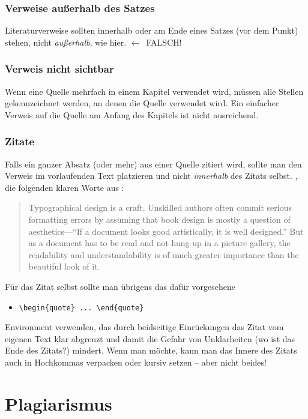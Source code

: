 \subsubsection{Verweise außerhalb des Satzes}
Literaturverweise sollten innerhalb oder am Ende eines Satzes (vor
dem Punkt) stehen, nicht \emph{außerhalb}, wie
hier. \cite[siehe][]{Oetiker01} $\leftarrow$~FALSCH!

\subsubsection{Verweis nicht sichtbar}
Wenn eine Quelle\cite{Kopka98} mehrfach in einem Kapitel verwendet wird, müssen alle Stellen gekennzeichnet werden, an denen die Quelle\cite{Kopka98} verwendet wird. Ein einfacher Verweis auf die Quelle\cite{Kopka98} am Anfang des Kapitels ist nicht ausreichend.

\subsubsection{Zitate}
Falls ein ganzer Absatz (oder mehr) aus einer Quelle zitiert wird,
sollte man den Verweis im vorlaufenden Text platzieren und nicht
\emph{innerhalb} des Zitats selbst. \ZB, die folgenden klaren Worte
aus :
\begin{quote}
Typographical design is a craft. Unskilled authors often commit
serious formatting errors by assuming that book design is mostly a
question of aesthetics---``If a document looks good artistically,
it is well designed.'' But as a document has to be read and not
hung up in a picture gallery, the readability and
understandability is of much greater importance than the beautiful
look of it.
\end{quote}
Für das Zitat selbst sollte man übrigens das dafür vorgesehene
%
\begin{itemize}
 \item[] \verb!\begin{quote} ... \end{quote}!
\end{itemize}
%
Environment verwenden, das durch beidseitige Einrückungen das
Zitat vom eigenen Text klar abgrenzt und damit die Gefahr von
Unklarheiten (wo ist das Ende des Zitats?) mindert.
Wenn man möchte, kann man das Innere des Zitats auch in Hochkommas verpacken oder kursiv setzen -- aber nicht beides!


\section{Plagiarismus}

